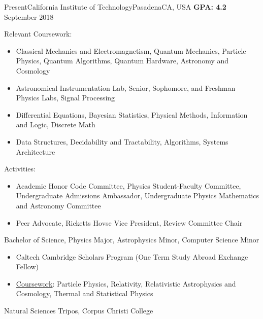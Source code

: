 \begin{educations}
  \education
    {Present}{California Institute of Technology}{Pasadena}{CA, USA \hfill \textbf{GPA: 4.2}}
    {September 2018} 
{
Relevant Coursework:
\begin{itemize}
\item Classical Mechanics and Electromagnetism, Quantum Mechanics, Particle Physics, Quantum Algorithms, Quantum Hardware, Astronomy and Cosmology
\item Astronomical Instrumentation Lab, Senior, Sophomore, and Freshman Physics Labs, Signal Processing
\item Differential Equations, Bayesian Statistics, Physical Methods, Information and Logic, Discrete Math
\item Data Structures, Decidability and Tractability, Algorithms, Systems Architecture
\end{itemize}
Activities:
\begin{itemize}
\item Academic Honor Code Committee, Physics Student-Faculty Committee, Undergraduate Admissions Ambassador, Undergraduate Physics Mathematics and Astronomy Committee
\item Peer Advocate, Ricketts Hovse Vice President, Review Committee Chair 
\end{itemize}
}
{Bachelor of Science, Physics Major, Astrophysics Minor, Computer Science Minor}

\emptySeparator

{\begin{itemize}
\item Caltech Cambridge Scholars Program (One Term Study Abroad Exchange Fellow)
\item \underline{Coursework}: Particle Physics, Relativity, Relativistic Astrophysics and Cosmology, Thermal and Statistical Physics
\end{itemize}}
{Natural Sciences Tripos, Corpus Christi College}

\end{educations}
